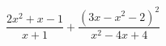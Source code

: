 \begin{ex}[type=expression]
	\begin{condition}
		\( \dfrac{2x^2+x-1}{x+1}+\dfrac{(3x-x^2-2)^2}{x^2-4x+4} \)
	\end{condition}
\end{ex}